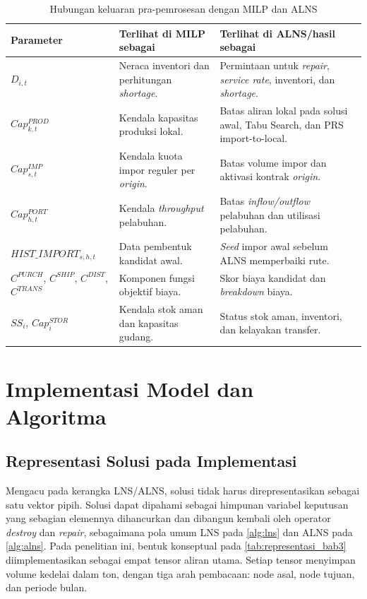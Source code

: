 \documentclass{file/TA-ITS}
\theoremstyle{definition}
\theoremstyle{definition}
\theoremstyle{plain}
\begin{document}
\begin{table}[H]
\centering
\caption{Hubungan keluaran pra-pemrosesan dengan MILP dan ALNS}
\label{tab:preprocess_to_milp_alns}
\scriptsize
\begin{tabularx}{\textwidth}{@{}p{}p{}X@{}}
\toprule
\textbf{Parameter} & \textbf{Terlihat di MILP sebagai} & \textbf{Terlihat di ALNS/hasil sebagai} \\
\midrule
$D_{i,t}$ & Neraca inventori dan perhitungan \textit{shortage}. & Permintaan untuk \textit{repair}, \textit{service rate}, inventori, dan \textit{shortage}. \\
$Cap^{PROD}_{k,t}$ & Kendala kapasitas produksi lokal. & Batas aliran lokal pada solusi awal, Tabu Search, dan PRS import-to-local. \\
$Cap^{IMP}_{s,t}$ & Kendala kuota impor reguler per \textit{origin}. & Batas volume impor dan aktivasi kontrak \textit{origin}. \\
$Cap^{PORT}_{h,t}$ & Kendala \textit{throughput} pelabuhan. & Batas \textit{inflow/outflow} pelabuhan dan utilisasi pelabuhan. \\
$HIST\_IMPORT_{s,h,t}$ & Data pembentuk kandidat awal. & \textit{Seed} impor awal sebelum ALNS memperbaiki rute. \\
$C^{PURCH}$, $C^{SHIP}$, $C^{DIST}$, $C^{TRANS}$ & Komponen fungsi objektif biaya. & Skor biaya kandidat dan \textit{breakdown} biaya. \\
$SS_i$, $Cap^{STOR}_i$ & Kendala stok aman dan kapasitas gudang. & Status stok aman, inventori, dan kelayakan transfer. \\
\bottomrule
\end{tabularx}
\end{table}

\section{Implementasi Model dan Algoritma}

\subsection{Representasi Solusi pada Implementasi}

Mengacu pada kerangka LNS/ALNS, solusi tidak harus direpresentasikan sebagai satu vektor pipih. Solusi dapat dipahami sebagai himpunan variabel keputusan yang sebagian elemennya dihancurkan dan dibangun kembali oleh operator \textit{destroy} dan \textit{repair}, sebagaimana pola umum LNS pada \ref{alg:lns} dan ALNS pada \ref{alg:alns}. Pada penelitian ini, bentuk konseptual pada \ref{tab:representasi_bab3} diimplementasikan sebagai empat tensor aliran utama. Setiap tensor menyimpan volume kedelai dalam ton, dengan tiga arah pembacaan: node asal, node tujuan, dan periode bulan.
\end{document}
